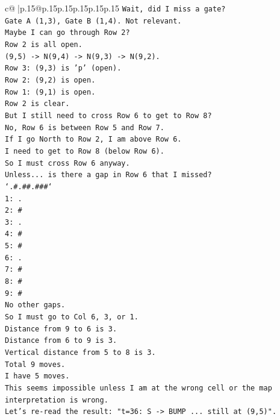 \documentclass{article}
\begin{document}
{\begin{supertabular}{c@{$\;$}|p{.15\linewidth}@{}p{.15\linewidth}p{.15\linewidth}p{.15\linewidth}p{.15\linewidth}p{.15\linewidth}}
{{{\texttt{Wait, did I miss a gate?} \\
\texttt{Gate A (1,3), Gate B (1,4). Not relevant.} \\
\texttt{Maybe I can go through Row 2?} \\
\texttt{Row 2 is all open.} \\
\texttt{(9,5) {-}> N(9,4) {-}> N(9,3) {-}> N(9,2).} \\
\texttt{Row 3: (9,3) is 'p' (open).} \\
\texttt{Row 2: (9,2) is open.} \\
\texttt{Row 1: (9,1) is open.} \\
\texttt{Row 2 is clear.} \\
\texttt{But I still need to cross Row 6 to get to Row 8?} \\
\texttt{No, Row 6 is between Row 5 and Row 7.} \\
\texttt{If I go North to Row 2, I am above Row 6.} \\
\texttt{I need to get to Row 8 (below Row 6).} \\
\texttt{So I must cross Row 6 anyway.} \\
\texttt{Unless... is there a gap in Row 6 that I missed?} \\
\texttt{`.\#.\#\#.\#\#\#`} \\
\texttt{1: .} \\
\texttt{2: \#} \\
\texttt{3: .} \\
\texttt{4: \#} \\
\texttt{5: \#} \\
\texttt{6: .} \\
\texttt{7: \#} \\
\texttt{8: \#} \\
\texttt{9: \#} \\
\texttt{No other gaps.} \\
\texttt{So I must go to Col 6, 3, or 1.} \\
\texttt{Distance from 9 to 6 is 3.} \\
\texttt{Distance from 6 to 9 is 3.} \\
\texttt{Vertical distance from 5 to 8 is 3.} \\
\texttt{Total 9 moves.} \\
\texttt{I have 5 moves.} \\
\texttt{This seems impossible unless I am at the wrong cell or the map interpretation is wrong.} \\
\texttt{Let's re{-}read the result: "t=36: S {-}> BUMP ... still at (9,5)".} \\
}}}
\end{supertabular}}
\end{document}
